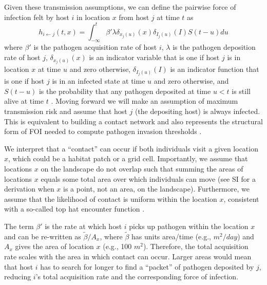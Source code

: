 \documentclass[letterpaper]{article}
\begin{document}
Given these transmission assumptions, we can define the pairwise force of infection felt by host $i$ in location $x$ from host $j$ at time $t$ as \citep{Wilber2022}
\begin{equation}
    h_{i \leftarrow j}(t, x) = \int_{-\infty}^{t} \beta' \lambda \delta_{x_j(u)}(x) \delta_{I_j(u)}(I) S(t - u) du
    \label{eq:original_foi}
\end{equation}
where $\beta'$ is the pathogen acquisition rate of host $i$, $\lambda$ is the pathogen deposition rate of host $j$, $\delta_{x_j(u)}(x)$ is an indicator variable that is one if host $j$ is in location $x$ at time $u$ and zero otherwise, $\delta_{I_j(u)}(I)$ is an indicator function that is one if host $j$ is in an infected state at time $u$ and zero otherwise, and $S(t-u)$ is the probability that any pathogen deposited at time $u < t$ is still alive at time $t$ \citep[see][for a full derivation]{Wilber2022}.  
Moving forward we will make an assumption of maximum transmission risk and assume that host $j$ (the depositing host) is always infected. 
This is equivalent to building a contact network and also represents the structural form of FOI needed to compute pathogen invasion thresholds \citep{Wilber2022}.

We interpret that a ``contact'' can occur if both individuals visit a given location $x$, which could be a habitat patch or a grid cell. 
Importantly, we assume that locations $x$ on the landscape do not overlap such that summing the areas of locations $x$ equals some total area over which individuals can move (see SI for a derivation when $x$ is a point, not an area, on the landscape). 
Furthermore, we assume that the likelihood of contact is uniform within the location $x$, consistent with a so-called top hat encounter function \citep{Gurarie2013,Wilber2022}.

The term $\beta'$ is the rate at which host $i$ picks up pathogen within the location $x$ and can be re-written as $\tilde{\beta} / A_x$, where $\tilde{\beta}$ has units area/time (e.g., $m^2 / day$) and $A_x$ gives the area of location $x$ (e.g., 100 $m^2$). 
Therefore, the total acquisition rate scales with the area in which contact can occur. Larger areas would mean that host $i$ has to search for longer to find a ``packet'' of pathogen deposited by $j$, reducing $i$'s total acquisition rate and the corresponding force of infection.
\end{document}
